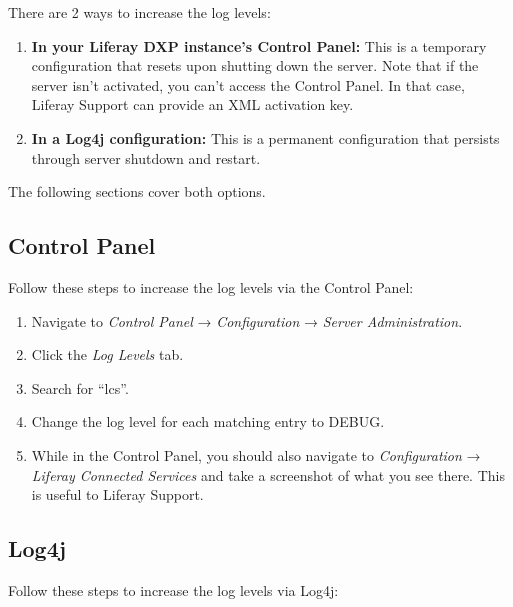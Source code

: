 There are 2 ways to increase the log levels:

\begin{enumerate}
\def\labelenumi{\arabic{enumi}.}
\item
  \textbf{In your Liferay DXP instance's Control Panel:} This is a
  temporary configuration that resets upon shutting down the server.
  Note that if the server isn't activated, you can't access the Control
  Panel. In that case, Liferay Support can provide an XML activation
  key.
\item
  \textbf{In a Log4j configuration:} This is a permanent configuration
  that persists through server shutdown and restart.
\end{enumerate}

The following sections cover both options.

\subsection{Control Panel}\label{control-panel}

Follow these steps to increase the log levels via the Control Panel:

\begin{enumerate}
\def\labelenumi{\arabic{enumi}.}
\item
  Navigate to \emph{Control Panel} → \emph{Configuration} → \emph{Server
  Administration}.
\item
  Click the \emph{Log Levels} tab.
\item
  Search for ``lcs''.
\item
  Change the log level for each matching entry to DEBUG.
\item
  While in the Control Panel, you should also navigate to
  \emph{Configuration} → \emph{Liferay Connected Services} and take a
  screenshot of what you see there. This is useful to Liferay Support.
\end{enumerate}

\subsection{Log4j}\label{log4j}

Follow these steps to increase the log levels via Log4j:

